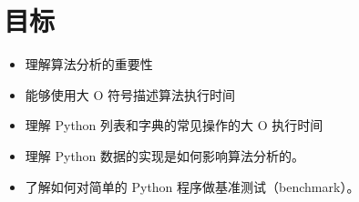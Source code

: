 \section{目标}
\begin{frame}\ft{\secname}
\begin{itemize}
\item 理解算法分析的重要性
\item 能够使用大 O 符号描述算法执行时间
\item 理解 Python 列表和字典的常见操作的大 O 执行时间
\item 理解 Python 数据的实现是如何影响算法分析的。
\item 了解如何对简单的 Python 程序做基准测试（benchmark）。
\end{itemize}
\end{frame}
